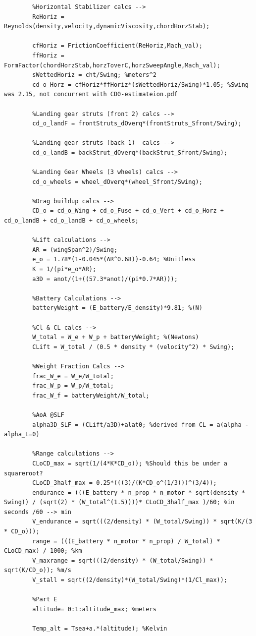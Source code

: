 \documentclass[12pt,A4paper]{article}
\begin{document}
\begin{lstlisting}
		%Horizontal Stabilizer calcs -->
		ReHoriz = Reynolds(density,velocity,dynamicViscosity,chordHorzStab);
		
		cfHoriz = FrictionCoefficient(ReHoriz,Mach_val);
		ffHoriz = FormFactor(chordHorzStab,horzToverC,horzSweepAngle,Mach_val);
		sWettedHoriz = cht/Swing; %meters^2
		cd_o_Horz = cfHoriz*ffHoriz*(sWettedHoriz/Swing)*1.05; %Swing was 2.15, not concurrent with CD0-estimateion.pdf
		
		%Landing gear struts (front 2) calcs -->
		cd_o_landF = frontStruts_dOverq*(frontStruts_Sfront/Swing);
		
		%Landing gear struts (back 1)  calcs -->
		cd_o_landB = backStrut_dOverq*(backStrut_Sfront/Swing);
		
		%Landing Gear Wheels (3 wheels) calcs -->
		cd_o_wheels = wheel_dOverq*(wheel_Sfront/Swing);
		
		%Drag buildup calcs -->
		CD_o = cd_o_Wing + cd_o_Fuse + cd_o_Vert + cd_o_Horz + cd_o_landB + cd_o_landB + cd_o_wheels;
		
		%Lift calculations -->
		AR = (wingSpan^2)/Swing;
		e_o = 1.78*(1-0.045*(AR^0.68))-0.64; %Unitless
		K = 1/(pi*e_o*AR);
		a3D = anot/(1+((57.3*anot)/(pi*0.7*AR)));
		
		%Battery Calculations -->
		batteryWeight = (E_battery/E_density)*9.81; %(N)
		
		%Cl & CL calcs -->
		W_total = W_e + W_p + batteryWeight; %(Newtons)
		CLift = W_total / (0.5 * density * (velocity^2) * Swing);
		
		%Weight Fraction Calcs -->
		frac_W_e = W_e/W_total;
		frac_W_p = W_p/W_total;
		frac_W_f = batteryWeight/W_total;
		
		%AoA @SLF
		alpha3D_SLF = (CLift/a3D)+alat0; %derived from CL = a(alpha - alpha_L=0)
		
		%Range calculations -->
		CLoCD_max = sqrt(1/(4*K*CD_o)); %Should this be under a squareroot?
		CLoCD_3half_max = 0.25*(((3)/(K*CD_o^(1/3)))^(3/4));
		endurance = (((E_battery * n_prop * n_motor * sqrt(density * Swing)) / (sqrt(2) * (W_total^(1.5))))* CLoCD_3half_max )/60; %in seconds /60 --> min
		V_endurance = sqrt(((2/density) * (W_total/Swing)) * sqrt(K/(3 * CD_o)));
		range = (((E_battery * n_motor * n_prop) / W_total) * CLoCD_max) / 1000; %km
		V_maxrange = sqrt(((2/density) * (W_total/Swing)) * sqrt(K/CD_o)); %m/s
		V_stall = sqrt((2/density)*(W_total/Swing)*(1/Cl_max));
		
		%Part E
		altitude= 0:1:altitude_max; %meters
		
		Temp_alt = Tsea+a.*(altitude); %Kelvin
		

\end{lstlisting}
\end{document}
